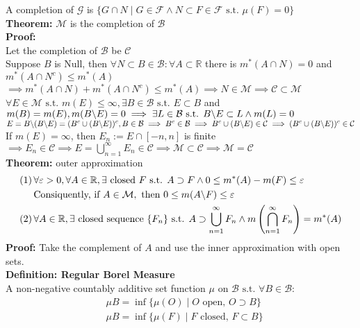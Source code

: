 \documentclass{article}
\newcommand{\R}{\mathbb{R}}
\newcommand{\infcap}{\displaystyle\bigcap_{n=1}^\infty}
\newcommand{\infcup}{\displaystyle\bigcup_{n=1}^\infty}
\newcommand{\cupninf}{\displaystyle\bigcup_{n=1}^\infty}
\newcommand{\bcsl}{\symbol{92}}
\newcommand{\st}{\mbox{ s.t. }}
\newcommand{\0}{{\bf{0}}}
\newcommand{\1}{{\bf{1}}}
\begin{document}
A completion of $\mathcal{G}$ is $\{G\cap N\mid G\in\mathcal{F}\land N\subset F\in\mathcal{F}\st \mu(F)=0\}$\\
\textbf{Theorem:} $\mathcal{M}$ is the completion of $\mathcal{B}$\\
\textbf{Proof:}\\
Let the completion of $\mathcal{B}$ be $\mathcal{C}$\\
Suppose $B$ is Null, then $\forall N\subset B\in\mathcal{B}:\forall A\subset\R$ there is $m^*(A\cap N)=0$ and $m^*(A\cap N^c)\le m^*(A)$\\
$\implies m^*(A\cap N)+m^*(A\cap N^c)\le m^*(A)\implies N\in\mathcal{M}\implies\mathcal{C}\subset\mathcal{M}$\\
$\forall E\in\mathcal{M}\st m(E)\le\infty,\exists B\in\mathcal{B}\st E\subset B$ and $m(B)=m(E),m(B\bcsl E)=0\implies\exists L\in\mathcal{B}\st B\bcsl E\subset L\land m(L)=0$\\
$E=B\bcsl(B\bcsl E)=(B^c\cup(B\bcsl E))^c,B\in\mathcal{B}\implies B^c\in\mathcal{B}\implies B^c\cup(B\bcsl E)\in\mathcal{C}\implies (B^c\cup(B\bcsl E))^c\in\mathcal{C}$\\
If $m(E)=\infty$, then $E_n:=E\cap[-n,n]$ is finite$\implies E_n\in\mathcal{C}\implies E=\cupninf E_n\in\mathcal{C}\implies\mathcal{M}\subset\mathcal{C}\implies\mathcal{M}=\mathcal{C}$\\
\textbf{Theorem:} outer approximation
\begin{equation}
\begin{split}
    (1)\,&\forall\varepsilon>0,\forall A\in\R,\exists\mbox{ closed }F\st A\supset F\land0\le m^*(A)-m(F)\le\varepsilon\\
    &\mbox{Consiquently, if }A\in\mathcal{M},\mbox{ then }0\le m(A\bcsl F)\le\varepsilon\\
    (2)\,&\forall A\in\R,\exists\mbox{ closed sequence }\{F_n\}\st A\supset\infcup F_n\land m\left(\infcap F_n\right)=m^*(A)
\end{split}
\end{equation}
\textbf{Proof:} Take the complement of $A$ and use the inner approximation with open sets.\\
\textbf{Definition: Regular Borel Measure}\\
A non-negative countably additive set function $\mu$ on $\mathcal{B}\st\forall B\in\mathcal{B}:$
\begin{equation}
\begin{split}
    &\mu{B}=\inf\{\mu(O)\mid O\mbox{ open, }O\supset B\}\\
    &\mu{B}=\inf\{\mu(F)\mid F\mbox{ closed, }F\subset B\}
\end{split}
\end{equation}
\end{document}
